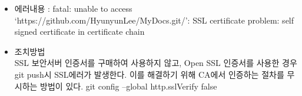 \documentclass[12pt,a4paper]{oblivoir}
\begin{document}
\begin{itemize}
\item 에러내용 : fatal: unable to access `https://github.com/HyunyunLee/MyDocs.git/': SSL certificate problem: self signed certificate in certificate chain
\item 조치방법 \\
SSL 보안서버 인증서를 구매하여 사용하지 않고, Open SSL 인증서를 사용한 경우 git push시 SSL에러가 발생한다.
이를 해결하기 위해 CA에서 인증하는 절차를 무시하는 방법이 있다.
git config --global http.sslVerify false
\end{itemize}
\end{document}
